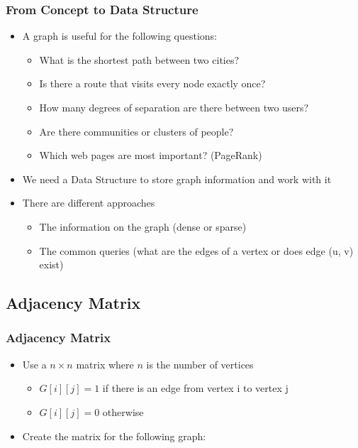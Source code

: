 \documentclass[11pt]{beamer}
\begin{document}
\begin{frame}\frametitle{From Concept to Data Structure}
\begin{itemize}
\item A graph is useful for the following questions:
    \begin{itemize}
    \item What is the shortest path between two cities?
    \item Is there a route that visits every node exactly once? 
    \item How many degrees of separation are there between two users?
    \item Are there communities or clusters of people?
    \item Which web pages are most important? (PageRank)
    \end{itemize}
\item We need a Data Structure to store graph information and work with it
\item There are different approaches
    \begin{itemize}
    \item The information on the graph (dense or sparse)
    \item The common queries (what are the edges of a vertex or does edge (u, v) exist)
    \end{itemize}
\end{itemize}
\end{frame}

\subsection{Adjacency Matrix}

\begin{frame}\frametitle{Adjacency Matrix}
\begin{itemize}
\item Use a $n\times n$ matrix where $n$ is the number of vertices
    \begin{itemize}
    \item $G[i][j] = 1$ if there is an edge from vertex i to vertex j
    \item $G[i][j] = 0$ otherwise
    \end{itemize}
\pause
\item Create the matrix for the following graph:
\end{itemize}
\begin{center}
\end{center}
\end{frame}
\end{document}
